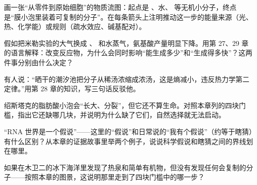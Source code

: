 \begin{sikaoti}
\item 画一张“从零件到原始细胞”的物质流图：起点是 、水、 等无机小分子，终点是“膜小泡里装着可复制的分子”。在每条箭头上注明推动这一步的能量来源（光、热、化学能）或规则（疏水效应、碱基配对）。
\item 假如把米勒实验的大气换成 、 和水蒸气，氨基酸产量明显下降。用第 27、29 章的语言解释：改变反应物，为什么会同时影响“能生成多少”和“生成得多快”？这两件事分别由什么决定？
\item 有人说：“晒干的潮汐池把分子从稀汤浓缩成浓汤，这是熵减小，违反热力学第二定律。”用第 28 章的知识，写三句话反驳他。
\item 绍斯塔克的脂肪酸小泡会“长大、分裂”，但它还不算生命。对照本章列的四块门槛，指出它还缺哪几块，并说明为什么缺了它们，自然选择就无法启动。
\item “RNA 世界是一个假说”——这里的“假说”和日常说的“我有个假说”（约等于瞎猜）有什么区别？从本章的证据故事里举两个例子，说说科学假说和瞎猜之间的界线划在哪里。
\item 如果在木卫二的冰下海洋里发现了热泉和简单有机物，但没有发现任何会复制的分子——按照本章的图景，这说明那里走到了四块门槛中的哪一步？
\end{sikaoti}
